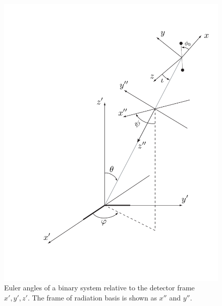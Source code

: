 \begin{figure}[p]
\label{f:euler}
\begin{center}
\includegraphics[width=\linewidth]{figures/inspiral/euler}
\end{center}
\caption[Coordinates Used to Describe the Response of a Gravitational Wave Interferometer]{%
Euler angles of a binary system relative to the detector frame $x',y',z'$. The
frame of radiation basis is shown as $x''$ and $y''$.
}
\end{figure}

